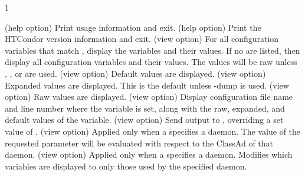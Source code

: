 \begin{ManPage}{\label{man-condor-config-val}}{1}
\begin{Options}
   {(help option) 
    Print usage information and exit.
   }
   {(help option) 
    Print the HTCondor version information and exit.
   }
   {(view option)
    For all configuration variables that match , display the variables and their values.
    If no  are listed, then display all configuration variables and their values.
    The values will be raw unless , , or  are used.
   }
   {(view option)
    Default values are displayed.
   }
   {(view option)
    Expanded values are displayed.  This is the default unless -dump is used.
   }
   {(view option)
    Raw values are displayed.
   }
   {(view option)
    Display configuration file name and line number where the variable is
    set, along with the raw, expanded, and default values of the variable.
   }
   {(view option)
    Send output to ,
    overriding a set value of . 
   }
   {(view option)
    Applied only when a  specifies a daemon.
    The value of the requested parameter will be evaluated with 
    respect to the ClassAd of that daemon.
   }
   {(view option)
    Applied only when a  specifies a daemon.
    Modifies which variables are displayed to only those 
    used by the specified daemon.
   }

\end{Options}
\end{ManPage}
